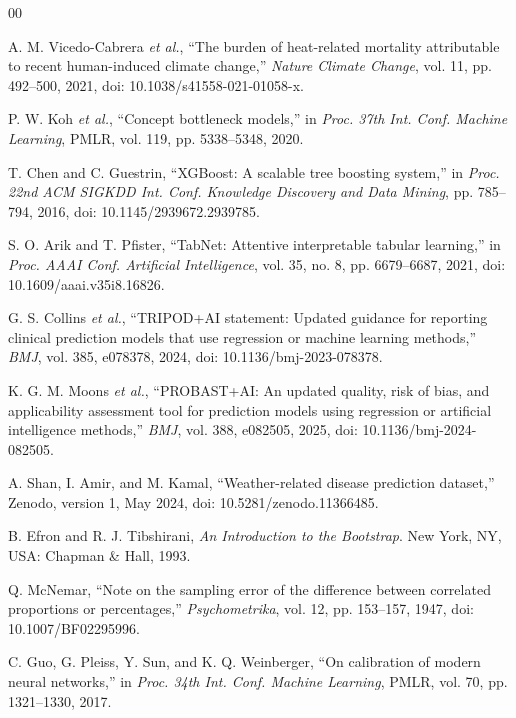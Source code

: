 \documentclass[conference]{IEEEtran}
\begin{document}
\balance
\begin{thebibliography}{00}

A. M. Vicedo-Cabrera \emph{et al.}, ``The burden of heat-related mortality
attributable to recent human-induced climate change,'' \emph{Nature Climate
Change}, vol. 11, pp. 492--500, 2021, doi:
10.1038/s41558-021-01058-x.

P. W. Koh \emph{et al.}, ``Concept bottleneck models,'' in \emph{Proc. 37th
Int. Conf. Machine Learning}, PMLR, vol. 119, pp. 5338--5348, 2020.

T. Chen and C. Guestrin, ``XGBoost: A scalable tree boosting system,'' in
\emph{Proc. 22nd ACM SIGKDD Int. Conf. Knowledge Discovery and Data Mining},
pp. 785--794, 2016, doi: 10.1145/2939672.2939785.

S. O. Arik and T. Pfister, ``TabNet: Attentive interpretable tabular
learning,'' in \emph{Proc. AAAI Conf. Artificial Intelligence}, vol. 35,
no. 8, pp. 6679--6687, 2021, doi: 10.1609/aaai.v35i8.16826.

G. S. Collins \emph{et al.}, ``TRIPOD+AI statement: Updated guidance for
reporting clinical prediction models that use regression or machine learning
methods,'' \emph{BMJ}, vol. 385, e078378, 2024, doi:
10.1136/bmj-2023-078378.

K. G. M. Moons \emph{et al.}, ``PROBAST+AI: An updated quality, risk of bias,
and applicability assessment tool for prediction models using regression or
artificial intelligence methods,'' \emph{BMJ}, vol. 388, e082505, 2025, doi:
10.1136/bmj-2024-082505.

A. Shan, I. Amir, and M. Kamal, ``Weather-related disease prediction
dataset,'' Zenodo, version 1, May 2024, doi: 10.5281/zenodo.11366485.

B. Efron and R. J. Tibshirani, \emph{An Introduction to the Bootstrap}.
New York, NY, USA: Chapman \& Hall, 1993.

Q. McNemar, ``Note on the sampling error of the difference between correlated
proportions or percentages,'' \emph{Psychometrika}, vol. 12, pp. 153--157,
1947, doi: 10.1007/BF02295996.

C. Guo, G. Pleiss, Y. Sun, and K. Q. Weinberger, ``On calibration of modern
neural networks,'' in \emph{Proc. 34th Int. Conf. Machine Learning}, PMLR,
vol. 70, pp. 1321--1330, 2017.

\end{thebibliography}
\end{document}
